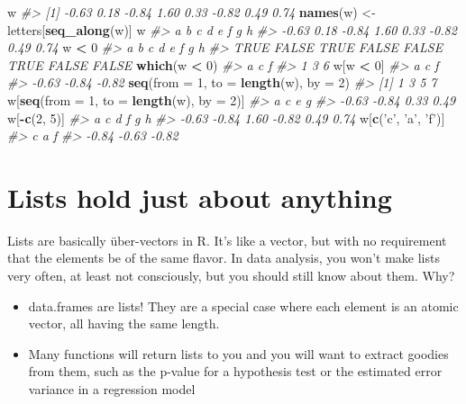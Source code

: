 \documentclass[
]{book}
\newenvironment{Shaded}{\begin{snugshade}}{\end{snugshade}}
\newcommand{\CommentTok}[1]{\textcolor[rgb]{0.56,0.35,0.01}{\textit{#1}}}
\newcommand{\DataTypeTok}[1]{\textcolor[rgb]{0.13,0.29,0.53}{#1}}
\newcommand{\DecValTok}[1]{\textcolor[rgb]{0.00,0.00,0.81}{#1}}
\newcommand{\KeywordTok}[1]{\textcolor[rgb]{0.13,0.29,0.53}{\textbf{#1}}}
\newcommand{\NormalTok}[1]{#1}
\newcommand{\OperatorTok}[1]{\textcolor[rgb]{0.81,0.36,0.00}{\textbf{#1}}}
\newcommand{\StringTok}[1]{\textcolor[rgb]{0.31,0.60,0.02}{#1}}
\providecommand{\tightlist}{%
  \setlength{\itemsep}{0pt}\setlength{\parskip}{0pt}}
\begin{document}
\begin{Shaded}
\begin{Highlighting}[]
\NormalTok{w}
\CommentTok{#> [1] -0.63  0.18 -0.84  1.60  0.33 -0.82  0.49  0.74}
\KeywordTok{names}\NormalTok{(w) <-}\StringTok{ }\NormalTok{letters[}\KeywordTok{seq_along}\NormalTok{(w)]}
\NormalTok{w}
\CommentTok{#>     a     b     c     d     e     f     g     h }
\CommentTok{#> -0.63  0.18 -0.84  1.60  0.33 -0.82  0.49  0.74}
\NormalTok{w }\OperatorTok{<}\StringTok{ }\DecValTok{0}
\CommentTok{#>     a     b     c     d     e     f     g     h }
\CommentTok{#>  TRUE FALSE  TRUE FALSE FALSE  TRUE FALSE FALSE}
\KeywordTok{which}\NormalTok{(w }\OperatorTok{<}\StringTok{ }\DecValTok{0}\NormalTok{)}
\CommentTok{#> a c f }
\CommentTok{#> 1 3 6}
\NormalTok{w[w }\OperatorTok{<}\StringTok{ }\DecValTok{0}\NormalTok{]}
\CommentTok{#>     a     c     f }
\CommentTok{#> -0.63 -0.84 -0.82}
\KeywordTok{seq}\NormalTok{(}\DataTypeTok{from =} \DecValTok{1}\NormalTok{, }\DataTypeTok{to =} \KeywordTok{length}\NormalTok{(w), }\DataTypeTok{by =} \DecValTok{2}\NormalTok{)}
\CommentTok{#> [1] 1 3 5 7}
\NormalTok{w[}\KeywordTok{seq}\NormalTok{(}\DataTypeTok{from =} \DecValTok{1}\NormalTok{, }\DataTypeTok{to =} \KeywordTok{length}\NormalTok{(w), }\DataTypeTok{by =} \DecValTok{2}\NormalTok{)]}
\CommentTok{#>     a     c     e     g }
\CommentTok{#> -0.63 -0.84  0.33  0.49}
\NormalTok{w[}\OperatorTok{-}\KeywordTok{c}\NormalTok{(}\DecValTok{2}\NormalTok{, }\DecValTok{5}\NormalTok{)]}
\CommentTok{#>     a     c     d     f     g     h }
\CommentTok{#> -0.63 -0.84  1.60 -0.82  0.49  0.74}
\NormalTok{w[}\KeywordTok{c}\NormalTok{(}\StringTok{'c'}\NormalTok{, }\StringTok{'a'}\NormalTok{, }\StringTok{'f'}\NormalTok{)]}
\CommentTok{#>     c     a     f }
\CommentTok{#> -0.84 -0.63 -0.82}
\end{Highlighting}
\end{Shaded}

\hypertarget{lists-hold-just-about-anything}{%
\section{Lists hold just about anything}\label{lists-hold-just-about-anything}}

Lists are basically über-vectors in R. It's like a vector, but with no requirement that the elements be of the same flavor. In data analysis, you won't make lists very often, at least not consciously, but you should still know about them. Why?

\begin{itemize}
\tightlist
\item
  data.frames are lists! They are a special case where each element is an atomic vector, all having the same length.
\item
  Many functions will return lists to you and you will want to extract goodies from them, such as the p-value for a hypothesis test or the estimated error variance in a regression model
\end{itemize}
\end{document}
